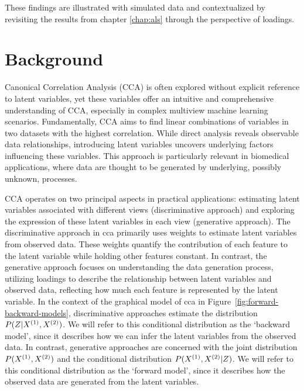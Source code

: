 These findings are illustrated with simulated data and contextualized by revisiting the results from chapter \ref{chap:als} through the perspective of loadings.

\section{Background}

Canonical Correlation Analysis (CCA) is often explored without explicit reference to latent variables, yet these variables offer an intuitive and comprehensive understanding of CCA, especially in complex multiview machine learning scenarios.
Fundamentally, CCA aims to find linear combinations of variables in two datasets with the highest correlation.
While direct analysis reveals observable data relationships, introducing latent variables uncovers underlying factors influencing these variables.
This approach is particularly relevant in biomedical applications, where data are thought to be generated by underlying, possibly unknown, processes.

CCA operates on two principal aspects in practical applications: estimating latent variables associated with different views (discriminative approach) and exploring the expression of these latent variables in each view (generative approach).
The discriminative approach in \acrshort{cca} primarily uses weights to estimate latent variables from observed data.
These weights quantify the contribution of each feature to the latent variable while holding other features constant.
In contrast, the generative approach focuses on understanding the data generation process, utilizing loadings to describe the relationship between latent variables and observed data, reflecting how much each feature is represented by the latent variable.
In the context of the graphical model of \acrshort{cca} in Figure~\ref{fig:forward-backward-models}, discriminative approaches estimate the distribution $P(Z|X^{(1)},X^{(2)})$.
We will refer to this conditional distribution as the `backward model', since it describes how we can infer the latent variables from the observed data.
In contrast, generative approaches are concerned with the joint distribution $P(X^{(1)},X^{(2)})$ and the conditional distribution $P(X^{(1)},X^{(2)}|Z)$.
We will refer to this conditional distribution as the `forward model', since it describes how the observed data are generated from the latent variables.

